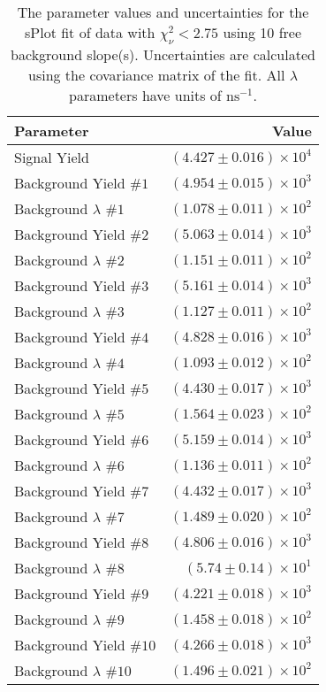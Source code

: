 
\begin{table}
    \begin{center}
        \begin{tabular}{lr}\toprule
            Parameter & Value \\\midrule
            Signal Yield & $(4.427 \pm 0.016) \times 10^{4}$ \\
            Background Yield $\#1$ & $(4.954 \pm 0.015) \times 10^{3}$ \\
            Background $\lambda$ $\#1$ & $(1.078 \pm 0.011) \times 10^{2}$ \\
            Background Yield $\#2$ & $(5.063 \pm 0.014) \times 10^{3}$ \\
            Background $\lambda$ $\#2$ & $(1.151 \pm 0.011) \times 10^{2}$ \\
            Background Yield $\#3$ & $(5.161 \pm 0.014) \times 10^{3}$ \\
            Background $\lambda$ $\#3$ & $(1.127 \pm 0.011) \times 10^{2}$ \\
            Background Yield $\#4$ & $(4.828 \pm 0.016) \times 10^{3}$ \\
            Background $\lambda$ $\#4$ & $(1.093 \pm 0.012) \times 10^{2}$ \\
            Background Yield $\#5$ & $(4.430 \pm 0.017) \times 10^{3}$ \\
            Background $\lambda$ $\#5$ & $(1.564 \pm 0.023) \times 10^{2}$ \\
            Background Yield $\#6$ & $(5.159 \pm 0.014) \times 10^{3}$ \\
            Background $\lambda$ $\#6$ & $(1.136 \pm 0.011) \times 10^{2}$ \\
            Background Yield $\#7$ & $(4.432 \pm 0.017) \times 10^{3}$ \\
            Background $\lambda$ $\#7$ & $(1.489 \pm 0.020) \times 10^{2}$ \\
            Background Yield $\#8$ & $(4.806 \pm 0.016) \times 10^{3}$ \\
            Background $\lambda$ $\#8$ & $(5.74 \pm 0.14) \times 10^{1}$ \\
            Background Yield $\#9$ & $(4.221 \pm 0.018) \times 10^{3}$ \\
            Background $\lambda$ $\#9$ & $(1.458 \pm 0.018) \times 10^{2}$ \\
            Background Yield $\#10$ & $(4.266 \pm 0.018) \times 10^{3}$ \\
            Background $\lambda$ $\#10$ & $(1.496 \pm 0.021) \times 10^{2}$ \\\bottomrule
        \end{tabular}
        \caption{The parameter values and uncertainties for the sPlot fit of data with $\chi^2_\nu < 2.75$ using 10 free background slope(s). Uncertainties are calculated using the covariance matrix of the fit. All $\lambda$ parameters have units of $\si{\nano\second}^{-1}$.}
    \end{center}
\end{table}

